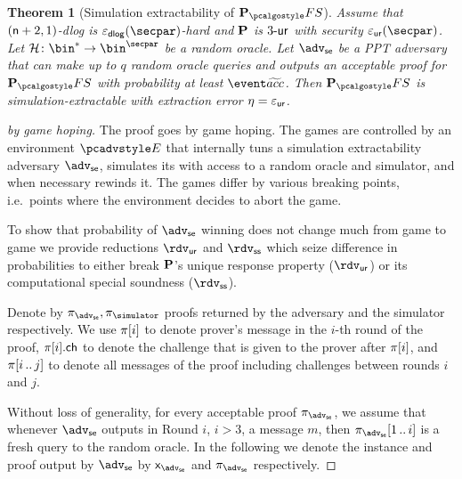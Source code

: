 \documentclass[runningheads,11pt]{llncs}
\newtheorem{theorem}{Theorem}%
\theoremstyle{definition}
\begin{document}
\begin{theorem}[Simulation extractability of $\plonkprot_\fs$]
	\label{thm:plonkprotfs_se}
	Assume that $(\mathsf{n} + 2, 1)$-dlog is $\eps_\dlog(\secpar)$-hard and $\mathbf{P}$ is ${3\text{-}\mathsf{ur}}$ with security $\epsur(\secpar)$. 
	Let $\ro\colon \bin^* \to \bin^\secpar$ be a random oracle. 
	Let $\advse$ be a PPT adversary that can make up to $q$ random oracle queries and outputs an acceptable proof for $\plonkprotfs$ with probability at least $\waccProb$.
	Then $\plonkprotfs$ is simulation-extractable with extraction error $\eta = \varepsilon_{\mathsf{ur}}$.
\end{theorem}
\begin{proof}[by game hoping]
	The proof goes by game hoping. The games are controlled by an environment $\env$ that internally tuns a simulation extractability adversary $\advse$, simulates its with access to a random oracle and simulator, and when necessary rewinds it.
	The games differ by various breaking points, i.e.~points where the environment decides to abort the game. 
	
	To show that probability of $\advse$ winning does not change much from game to game we provide reductions $\rdvur$ and $\rdvss$ which seize difference in probabilities to either break $\mathbf{P}$'s unique response property ($\rdvur$) or its computational special soundness ($\rdvss$).

	Denote by $\zkproof_{\advse}, \zkproof_{\simulator}$ proofs
	returned by the adversary and the simulator respectively. We use $\pi[i]$
	to denote prover's message in the $i$-th round of the proof, $\pi[i].\mathsf{ch}$
	to denote the challenge that is given to the prover after $\pi[i]$, and
	$\pi[i \, .. \, j]$ to denote all messages of the proof including challenges between rounds $i$ and $j$.

	Without loss of generality, for every acceptable proof $\zkproof_{\advse}$, we
	assume that whenever $\advse$ outputs in Round $i$, $i 
	> 3$, a message $m$, then
	$\zkproof_{\advse}\range{1}{i}$ is a fresh query to the random oracle.
	In the following we denote the instance and proof output by $\advse$ by $\inp_\advse$ and $\zkproof_\advse$ respectively.
	

\end{proof}
\end{document}
